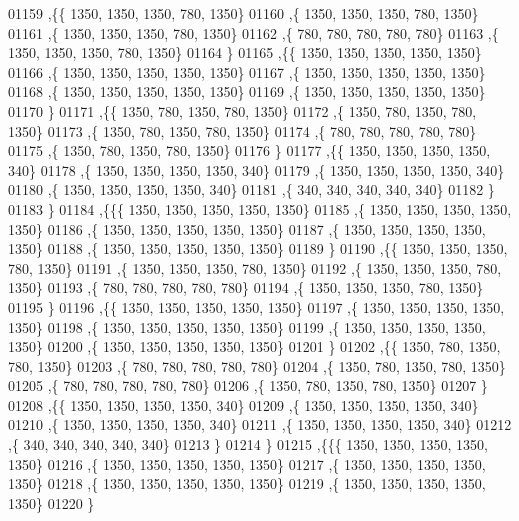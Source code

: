 \begin{DoxyCode}
01159   ,\{\{  1350,  1350,  1350,   780,  1350\}
01160    ,\{  1350,  1350,  1350,   780,  1350\}
01161    ,\{  1350,  1350,  1350,   780,  1350\}
01162    ,\{   780,   780,   780,   780,   780\}
01163    ,\{  1350,  1350,  1350,   780,  1350\}
01164    \}
01165   ,\{\{  1350,  1350,  1350,  1350,  1350\}
01166    ,\{  1350,  1350,  1350,  1350,  1350\}
01167    ,\{  1350,  1350,  1350,  1350,  1350\}
01168    ,\{  1350,  1350,  1350,  1350,  1350\}
01169    ,\{  1350,  1350,  1350,  1350,  1350\}
01170    \}
01171   ,\{\{  1350,   780,  1350,   780,  1350\}
01172    ,\{  1350,   780,  1350,   780,  1350\}
01173    ,\{  1350,   780,  1350,   780,  1350\}
01174    ,\{   780,   780,   780,   780,   780\}
01175    ,\{  1350,   780,  1350,   780,  1350\}
01176    \}
01177   ,\{\{  1350,  1350,  1350,  1350,   340\}
01178    ,\{  1350,  1350,  1350,  1350,   340\}
01179    ,\{  1350,  1350,  1350,  1350,   340\}
01180    ,\{  1350,  1350,  1350,  1350,   340\}
01181    ,\{   340,   340,   340,   340,   340\}
01182    \}
01183   \}
01184  ,\{\{\{  1350,  1350,  1350,  1350,  1350\}
01185    ,\{  1350,  1350,  1350,  1350,  1350\}
01186    ,\{  1350,  1350,  1350,  1350,  1350\}
01187    ,\{  1350,  1350,  1350,  1350,  1350\}
01188    ,\{  1350,  1350,  1350,  1350,  1350\}
01189    \}
01190   ,\{\{  1350,  1350,  1350,   780,  1350\}
01191    ,\{  1350,  1350,  1350,   780,  1350\}
01192    ,\{  1350,  1350,  1350,   780,  1350\}
01193    ,\{   780,   780,   780,   780,   780\}
01194    ,\{  1350,  1350,  1350,   780,  1350\}
01195    \}
01196   ,\{\{  1350,  1350,  1350,  1350,  1350\}
01197    ,\{  1350,  1350,  1350,  1350,  1350\}
01198    ,\{  1350,  1350,  1350,  1350,  1350\}
01199    ,\{  1350,  1350,  1350,  1350,  1350\}
01200    ,\{  1350,  1350,  1350,  1350,  1350\}
01201    \}
01202   ,\{\{  1350,   780,  1350,   780,  1350\}
01203    ,\{   780,   780,   780,   780,   780\}
01204    ,\{  1350,   780,  1350,   780,  1350\}
01205    ,\{   780,   780,   780,   780,   780\}
01206    ,\{  1350,   780,  1350,   780,  1350\}
01207    \}
01208   ,\{\{  1350,  1350,  1350,  1350,   340\}
01209    ,\{  1350,  1350,  1350,  1350,   340\}
01210    ,\{  1350,  1350,  1350,  1350,   340\}
01211    ,\{  1350,  1350,  1350,  1350,   340\}
01212    ,\{   340,   340,   340,   340,   340\}
01213    \}
01214   \}
01215  ,\{\{\{  1350,  1350,  1350,  1350,  1350\}
01216    ,\{  1350,  1350,  1350,  1350,  1350\}
01217    ,\{  1350,  1350,  1350,  1350,  1350\}
01218    ,\{  1350,  1350,  1350,  1350,  1350\}
01219    ,\{  1350,  1350,  1350,  1350,  1350\}
01220    \}

\end{DoxyCode}
